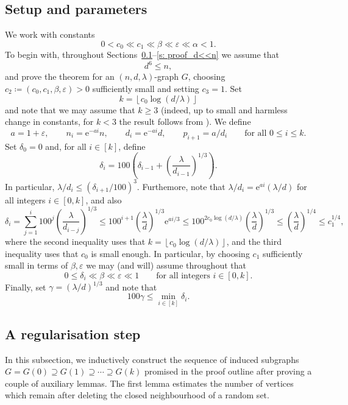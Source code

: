 \documentclass[reqno,a4paper]{amsart}
\theoremstyle{definition}
\newcommand{\eps}{\varepsilon}
\newcommand{\e}{\mathrm{e}}
\begin{document}
\subsection{Setup and parameters}\label{s: setup}
We work with constants 
\[
    0<c_0\ll c_1\ll \beta\ll \eps\ll\alpha<1.
\]
To begin with, throughout Sections~\ref{s: setup}--\ref{s: proof_d<<n} we assume that
\begin{equation}\label{eq: d-small}
    d^6\le n,
\end{equation}
and prove the theorem for an $(n,d,\lambda)$-graph $G$, choosing $c_2\coloneqq (c_0,c_1,\beta,\eps)>0$ sufficiently small and setting $c_3=1$. Set 
\[
k=\left\lfloor c_0\log(d/\lambda)\right\rfloor
\]
and note that we may assume that $k\ge3$ (indeed, up to small and harmless change in constants, for $k<3$ the result follows from \cite[Theorem 1]{DKMZ25}).
We define
\[
    a=1+\eps,
    \qquad
    n_i=\e^{-ai}n,
    \qquad
    d_i=\e^{-ai}d,
    \qquad
    p_{i+1}=a/d_i
    \qquad \text{for all $0\le i\le k$}.
\]
Set $\delta_0=0$ and, for all $i\in [k]$, define
\[
    \delta_i=100\left(\delta_{i-1}+\left(\frac{\lambda}{d_{i-1}}\right)^{1/3}\right).
\]
In particular, $\lambda/d_i\le (\delta_{i+1}/100)^3$. Furthemore, note that $\lambda / d_i=\e^{ai}(\lambda/d)$ for all integers $i \in [0,k]$, and also
\begin{equation}\label{eq: bound on delta}
    \delta_i = \sum_{j=1}^i 100^j \left(\frac{\lambda}{d_{i-j}}\right)^{1/3} \le 100^{i+1}\left(\frac{\lambda}{d}\right)^{1/3}\e^{ai/3}
    \le 100^{2c_0\log(d/\lambda)}\left(\frac{\lambda}{d}\right)^{1/3}\le \left(\frac{\lambda}{d}\right)^{1/4}\le c_1^{1/4},
\end{equation}
where the second inequality uses that $k=\left\lfloor c_0\log(d/\lambda)\right\rfloor$, and the third inequality uses that $c_0$ is small enough. In particular, by choosing $c_1$ sufficiently small in terms of $\beta,\eps$ we may (and will) assume throughout that
\begin{equation}\label{eq: hierarchy}
    0\le\delta_i\ll \beta \ll \eps\ll1
    \qquad\text{for all integers }i\in [0,k].
\end{equation}
Finally, set $\gamma=(\lambda/d)^{1/3}$ and note that
\begin{equation}\label{eq:gamma}
100\gamma\le \min_{i\in [k]} \delta_i.
\end{equation}

\subsection{A regularisation step}\label{s: regular}
In this subsection, we inductively construct the sequence of induced subgraphs $G=G(0)\supseteq G(1)\supseteq\cdots\supseteq G(k)$ promised in the proof outline after proving a couple of auxiliary lemmas. 
The first lemma estimates the number of vertices which remain after deleting the closed neighbourhood of a random set.
\end{document}
